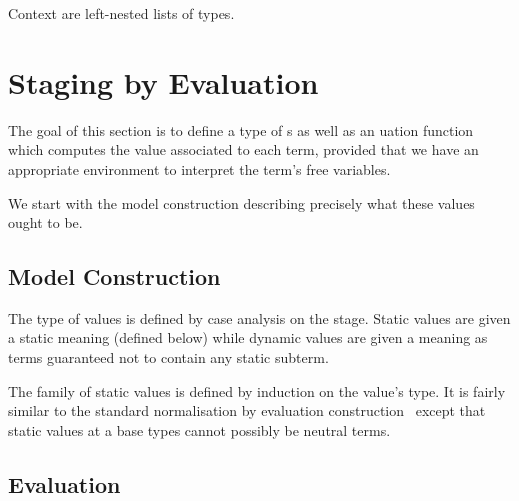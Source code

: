 \documentclass{article}
\begin{document}
Context are left-nested lists of types.




\section{Staging by Evaluation}

The goal of this section is to define a type of s
as well as an uation function which computes the
value associated to each term, provided that we have an
appropriate environment to interpret the term's free variables.


We start with the model construction describing precisely
what these values ought to be.

\subsection{Model Construction}

The type of values is defined by case analysis on the stage.
%
Static values are given a static meaning (defined below)
while dynamic values are given a meaning as terms
guaranteed not to contain any static subterm.


The family of static values is defined by induction on
the value's type. It is fairly similar to the standard
normalisation by evaluation
construction~\cite{DBLP:conf/lics/BergerS91,DBLP:journals/mscs/CoquandD97,DBLP:journals/lisp/Coquand02}
except that static values at a base types cannot possibly
be neutral terms.

\begin{AgdaSuppressSpace}
\end{AgdaSuppressSpace}






\subsection{Evaluation}
\end{document}
